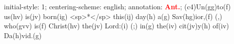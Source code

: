 initial-style: 1;
centering-scheme: english;
annotation: \textbf{\textcolor{red}{Ant.}};
(c4)Un(gg)to(f) us(hv) is(jv) born(ig) <sp>*</sp> this(ij) day(h) a(g) Sav(hg)ior,(f) (,) who(gvv) is(f) Christ(hv) the(jv) Lord:(i) (;) in(g) the(iv) cit(jv)y(h) of(iv) Da(h)vid.(g)